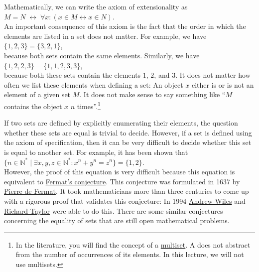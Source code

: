 \noindent
Mathematically, we can write the axiom of extensionality as
\\[0.2cm]
\hspace*{1.3cm} $M = N \;\leftrightarrow\; \forall x: (x \in M \leftrightarrow x \in N)$. 
\\[0.2cm]
An important consequence of this axiom is the fact that the order in which the
elements are listed in a set does not matter.  For example, we have 
\\[0.2cm] 
\hspace*{1.3cm} $\{1,2,3\} = \{3,2,1\}$, 
\\[0.2cm]
because both sets contain the same elements.  Similarly, we have
\\[0.2cm]
\hspace*{1.3cm}
$\{1,2,2,3\} = \{1,1,2,3,3\}$,
\\[0.2cm]
because both these sets contain the elements $1$, $2$, and $3$.  It does not matter how often we list these
elements when defining a set:  An object $x$ either is or is not an element of a given set $M$.  It does not
make sense to say something like ``$M$ contains the object $x$ $n$ times''.\footnote{In the literature, you will find
the concept of a \href{https://en.wikipedia.org/wiki/Multiset}{multiset}.  A  does not abstract
from the number of occurrences of its elements.  In this lecture, we will not use multisets.}

If two sets are defined by explicitly enumerating their elements, the question whether
these sets are equal is trivial to decide.  However, if a set is defined using the axiom of specification, then
it can be very difficult to decide whether this set is equal to another set.  For 
example, it has been shown that \\[0.2cm]
\hspace*{1.3cm} 
$\{ n \in \mathbb{N}^* \mid \exists x, y, z\in\mathbb{N}^*: x^n + y^n = z^n \} = \{1, 2\}$. 
\\[0.2cm]
However, the proof of this equation is very difficult because this equation
is equivalent to \href{https://en.wikipedia.org/wiki/Fermat%27s_Last_Theorem}{Fermat's conjecture}. 
This conjecture was formulated in 1637 by \href{https://de.wikipedia.org/wiki/Pierre_de_Fermat}{Pierre de Fermat}.  
It took mathematicians more than three centuries to come up with a rigorous proof that validates this conjecture:
In 1994 \href{https://de.wikipedia.org/wiki/Andrew_Wiles}{Andrew Wiles}
and \href{https://de.wikipedia.org/wiki/Richard_Taylor_(Mathematician)}{Richard Taylor} were able to do this.
There are some similar conjectures concerning the equality of sets that are still open mathematical problems. 


